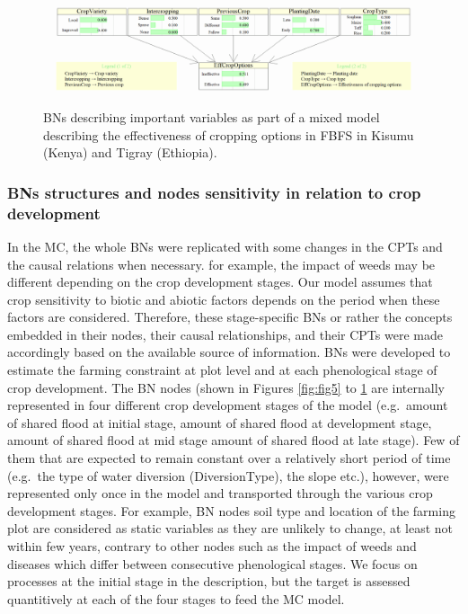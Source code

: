 \documentclass[12pt,oneside]{article}
\begin{document}
\begin{figure}[!htbp]

{\centering \includegraphics[width=1\linewidth,]{figures/Modelling_FBFS_Suppl_Effectiveness_of_cropping_options_BNs_plot} 

}

\caption{BNs describing important variables as part of a mixed model describing the effectiveness of cropping options in FBFS in Kisumu (Kenya) and Tigray (Ethiopia).}\label{fig:fig6}
\end{figure}

\hypertarget{II15}{%
\subsubsection{BNs structures and nodes sensitivity in relation to crop development}\label{II15}}

In the MC, the whole BNs were replicated with some changes in the CPTs and the causal relations when necessary. for example, the impact of weeds may be different depending on the crop development stages. Our model assumes that crop sensitivity to biotic and abiotic factors depends on the period when these factors are considered. Therefore, these stage-specific BNs or rather the concepts embedded in their nodes, their causal relationships, and their CPTs were made accordingly based on the available source of information. BNs were developed to estimate the farming constraint at plot level and at each phenological stage of crop development. The BN nodes (shown in Figures \ref{fig:fig5} to \ref{fig:fig6} are internally represented in four different crop development stages of the model (e.g.~amount of shared flood at initial stage, amount of shared flood at development stage, amount of shared flood at mid stage amount of shared flood at late stage). Few of them that are expected to remain constant over a relatively short period of time (e.g.~the type of water diversion (DiversionType), the slope etc.), however, were represented only once in the model and transported through the various crop development stages. For example, BN nodes soil type and location of the farming plot are considered as static variables as they are unlikely to change, at least not within few years, contrary to other nodes such as the impact of weeds and diseases which differ between consecutive phenological stages. We focus on processes at the initial stage in the description, but the target is assessed quantitively at each of the four stages to feed the MC model.
\end{document}
